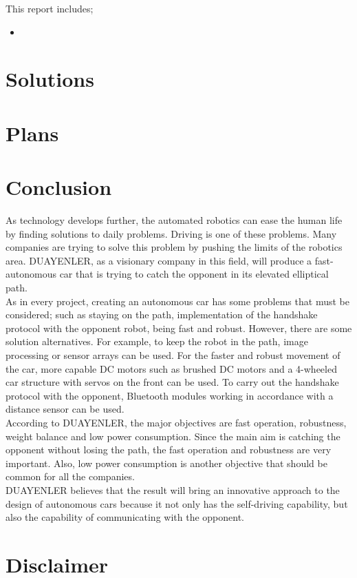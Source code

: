 \documentclass[a4paper,12pt]{article}
\begin{document}
	
This report includes;
\begin{itemize}
	\item 
\end{itemize} 


\section{Solutions}

\section{Plans}


\section{Conclusion}
As technology develops further, the automated robotics can ease the human life by finding solutions to daily problems. Driving is one of these problems. Many companies are trying to solve this problem by pushing the limits of the robotics area. DUAYENLER, as a visionary company in this field, will produce a fast-autonomous car that is trying to catch the opponent in its elevated elliptical path.\\

As in every project, creating an autonomous car has some problems that must be considered; such as staying on the path, implementation of the handshake protocol with the opponent robot, being fast and robust. However, there are some solution alternatives. For example, to keep the robot in the path, image processing or sensor arrays can be used. For the faster and robust movement of the car, more capable DC motors such as brushed DC motors and a 4-wheeled car structure with servos on the front can be used. To carry out the handshake protocol with the opponent, Bluetooth modules working in accordance with a distance sensor can be used.\\

According to DUAYENLER, the major objectives are fast operation, robustness, weight balance and low power consumption. Since the main aim is catching the opponent without losing the path, the fast operation and robustness are very important. Also, low power consumption is another objective that should be common for all the companies.\\

DUAYENLER believes that the result will bring an innovative approach to the design of autonomous cars because it not only has the self-driving capability, but also the capability of communicating with the opponent.


\section{Disclaimer}
\end{document}
